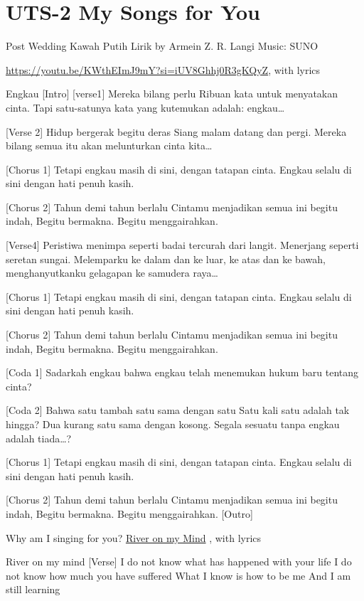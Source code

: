 \documentclass[
  letterpaper,
  DIV=11,
  numbers=noendperiod]{scrreprt}
\begin{document}

\chapter{UTS-2 My Songs for You}\label{uts-2-my-songs-for-you}

Post Wedding Kawah Putih Lirik by Armein Z. R. Langi Music: SUNO

\url{https://youtu.be/KWthEImJ9mY?si=iUV8Ghhj0R3gKQyZ}, with lyrics

Engkau {[}Intro{]} {[}verse1{]} Mereka bilang perlu Ribuan kata untuk
menyatakan cinta. Tapi satu-satunya kata yang kutemukan adalah:
engkau\ldots{}

{[}Verse 2{]} Hidup bergerak begitu deras Siang malam datang dan pergi.
Mereka bilang semua itu akan melunturkan cinta kita\ldots{}

{[}Chorus 1{]} Tetapi engkau masih di sini, dengan tatapan cinta. Engkau
selalu di sini dengan hati penuh kasih.

{[}Chorus 2{]} Tahun demi tahun berlalu Cintamu menjadikan semua ini
begitu indah, Begitu bermakna. Begitu menggairahkan.

{[}Verse4{]} Peristiwa menimpa seperti badai tercurah dari langit.
Menerjang seperti seretan sungai. Melemparku ke dalam dan ke luar, ke
atas dan ke bawah, menghanyutkanku gelagapan ke samudera raya\ldots{}

{[}Chorus 1{]} Tetapi engkau masih di sini, dengan tatapan cinta. Engkau
selalu di sini dengan hati penuh kasih.

{[}Chorus 2{]} Tahun demi tahun berlalu Cintamu menjadikan semua ini
begitu indah, Begitu bermakna. Begitu menggairahkan.

{[}Coda 1{]} Sadarkah engkau bahwa engkau telah menemukan hukum baru
tentang cinta?

{[}Coda 2{]} Bahwa satu tambah satu sama dengan satu Satu kali satu
adalah tak hingga? Dua kurang satu sama dengan kosong. Segala sesuatu
tanpa engkau adalah tiada\ldots?

{[}Chorus 1{]} Tetapi engkau masih di sini, dengan tatapan cinta. Engkau
selalu di sini dengan hati penuh kasih.

{[}Chorus 2{]} Tahun demi tahun berlalu Cintamu menjadikan semua ini
begitu indah, Begitu bermakna. Begitu menggairahkan. {[}Outro{]}

Why am I singing for you? \href{./Rivers\%20In\%20My\%20Mind.mp3}{River
on my Mind} , with lyrics

River on my mind {[}Verse{]} I do not know what has happened with your
life I do not know how much you have suffered What I know is how to be
me And I am still learning
\end{document}
